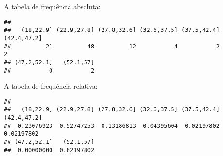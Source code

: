 \documentclass[
]{article}
\newenvironment{Shaded}{\begin{snugshade}}{\end{snugshade}}
\newcommand{\DataTypeTok}[1]{\textcolor[rgb]{0.13,0.29,0.53}{#1}}
\newcommand{\DecValTok}[1]{\textcolor[rgb]{0.00,0.00,0.81}{#1}}
\newcommand{\KeywordTok}[1]{\textcolor[rgb]{0.13,0.29,0.53}{\textbf{#1}}}
\newcommand{\NormalTok}[1]{#1}
\newcommand{\OperatorTok}[1]{\textcolor[rgb]{0.81,0.36,0.00}{\textbf{#1}}}
\newcommand{\StringTok}[1]{\textcolor[rgb]{0.31,0.60,0.02}{#1}}
\begin{document}
\begin{Shaded}
\end{Shaded}

A tabela de frequência absoluta:

\begin{Shaded}
\end{Shaded}

\begin{verbatim}
## 
##   (18,22.9] (22.9,27.8] (27.8,32.6] (32.6,37.5] (37.5,42.4] (42.4,47.2] 
##          21          48          12           4           2           2 
## (47.2,52.1]   (52.1,57] 
##           0           2
\end{verbatim}

A tabela de frequência relativa:

\begin{Shaded}
\end{Shaded}

\begin{verbatim}
## 
##   (18,22.9] (22.9,27.8] (27.8,32.6] (32.6,37.5] (37.5,42.4] (42.4,47.2] 
##  0.23076923  0.52747253  0.13186813  0.04395604  0.02197802  0.02197802 
## (47.2,52.1]   (52.1,57] 
##  0.00000000  0.02197802
\end{verbatim}
\end{document}

